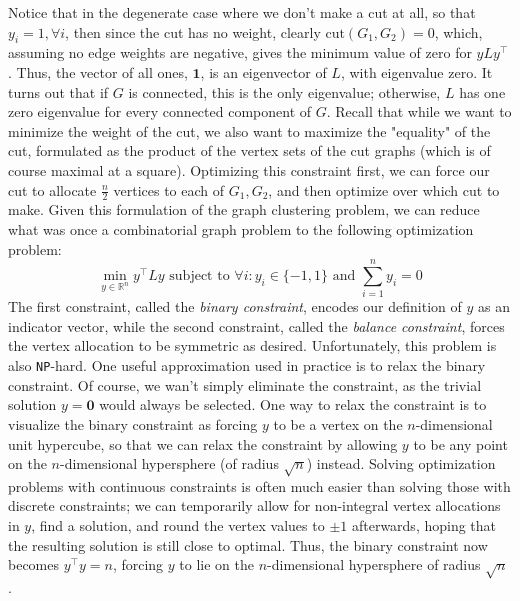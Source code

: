 \documentclass{article}
\begin{document}
\newline
Notice that in the degenerate case where we don't make a cut at all, so that $ y_i = 1, \forall i $, then since the cut has no weight, clearly $ \text{cut}(G_1, G_2) = 0 $, which, assuming no edge weights are negative, gives the minimum value of zero for $ y L y^\intercal $. Thus, the vector of all ones, $ \mathbf{1} $, is an eigenvector of $ L $, with eigenvalue zero. It turns out that if $ G $ is connected, this is the only eigenvalue; otherwise, $ L $ has one zero eigenvalue for every connected component of $ G $. 
\newline \newline
Recall that while we want to minimize the weight of the cut, we also want to maximize the "equality" of the cut, formulated as the product of the vertex sets of the cut graphs (which is of course maximal at a square). Optimizing this constraint first, we can force our cut to allocate $ \frac{n}{2} $ vertices to each of $ G_1, G_2 $, and then optimize over which cut to make. Given this formulation of the graph clustering problem, we can reduce what was once a combinatorial graph problem to the following optimization problem:
$$ \min_{y \in \mathbb{R}^n} y^\intercal L y \text{ subject to } \forall i: y_i \in \{ -1, 1 \} \text{ and } \sum_{i = 1}^n y_i = 0 $$
The first constraint, called the \textit{binary constraint}, encodes our definition of $ y $ as an indicator vector, while the second constraint, called the \textit{balance constraint}, forces the vertex allocation to be symmetric as desired. Unfortunately, this problem is also \texttt{NP}-hard. One useful approximation used in practice is to relax the binary constraint. Of course, we wan't simply eliminate the constraint, as the trivial solution $ y = \mathbf{0} $ would always be selected. One way to relax the constraint is to visualize the binary constraint as forcing $ y $ to be a vertex on the $ n $-dimensional unit hypercube, so that we can relax the constraint by allowing $ y $ to be any point on the $ n $-dimensional hypersphere (of radius $ \sqrt{n} $) instead. Solving optimization problems with continuous constraints is often much easier than solving those with discrete constraints; we can temporarily allow for non-integral vertex allocations in $ y $, find a solution, and round the vertex values to $ \pm 1 $ afterwards, hoping that the resulting solution is still close to optimal. 
\newline
Thus, the binary constraint now becomes $ y^\intercal y = n $, forcing $ y $ to lie on the $ n $-dimensional hypersphere of radius $ \sqrt{n} $.
\end{document}
